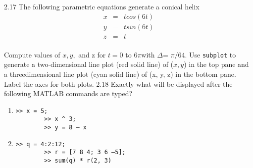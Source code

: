 \documentclass[../main.tex]{subfiles}
\begin{document}
\begin{multicols}{2}
2.17 The following parametric equations generate a conical
helix
\[ \begin{array}{lll}
	x &= &t cos(6t)\\
	y &= &t sin(6t)\\
	z &= &t\\

	
\end{array} \]

Compute values of $x, y,$ and z for $t = 0$ to $6\pi $with
$\Delta $= $\pi/64$. Use \texttt{subplot} to generate a two-dimensional
line plot (red solid line) of ($x, y$) in the top pane and a threedimensional line plot (cyan solid line) of (x, y, z) in the
bottom pane. Label the axes for both plots.
2.18 Exactly what will be displayed after the following
MATLAB commands are typed?
\begin{enumerate}[label=(\alph*)]
		

	\item 
	\begin{lstlisting}[frame=none, numbers=none]
		>> x = 5;
		>> x ^ 3;
		>> y = 8 – x
	\end{lstlisting}
	\item 
	\begin{lstlisting}[frame=none, numbers=none]
		>> q = 4:2:12;
		>> r = [7 8 4; 3 6 –5];
		>> sum(q) * r(2, 3) 
	\end{lstlisting}
\end{enumerate}


\end{multicols}
\end{document}
